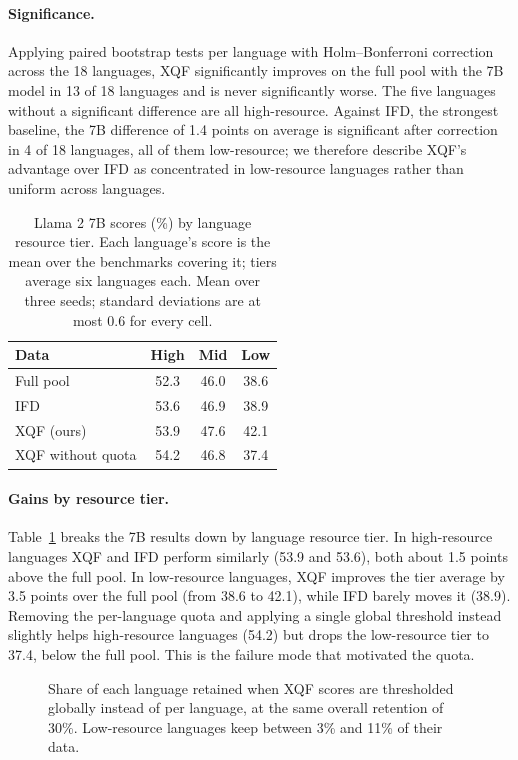 \documentclass{article}
\begin{document}
\paragraph{Significance.}
Applying paired bootstrap tests per language with Holm--Bonferroni correction across the 18 languages, XQF significantly improves on the full pool with the 7B model in 13 of 18 languages and is never significantly worse. The five languages without a significant difference are all high-resource. Against IFD, the strongest baseline, the 7B difference of 1.4 points on average is significant after correction in 4 of 18 languages, all of them low-resource; we therefore describe XQF's advantage over IFD as concentrated in low-resource languages rather than uniform across languages.

\begin{table}[t]
\centering
\caption{Llama 2 7B scores (\%) by language resource tier. Each language's score is the mean over the benchmarks covering it; tiers average six languages each. Mean over three seeds; standard deviations are at most 0.6 for every cell.}
\label{tab:tiers}
\small
\begin{tabular}{lccc}
\toprule
Data & High & Mid & Low \\
\midrule
Full pool & 52.3 & 46.0 & 38.6 \\
IFD & 53.6 & 46.9 & 38.9 \\
XQF (ours) & 53.9 & 47.6 & 42.1 \\
XQF without quota & 54.2 & 46.8 & 37.4 \\
\bottomrule
\end{tabular}
\end{table}

\paragraph{Gains by resource tier.}
Table~\ref{tab:tiers} breaks the 7B results down by language resource tier. In high-resource languages XQF and IFD perform similarly (53.9 and 53.6), both about 1.5 points above the full pool. In low-resource languages, XQF improves the tier average by 3.5 points over the full pool (from 38.6 to 42.1), while IFD barely moves it (38.9). Removing the per-language quota and applying a single global threshold instead slightly helps high-resource languages (54.2) but drops the low-resource tier to 37.4, below the full pool. This is the failure mode that motivated the quota.

\begin{figure}[t]
\centering
{}
\caption{Share of each language retained when XQF scores are thresholded globally instead of per language, at the same overall retention of 30\%. Low-resource languages keep between 3\% and 11\% of their data.}
\label{fig:retention}
\end{figure}
\end{document}
